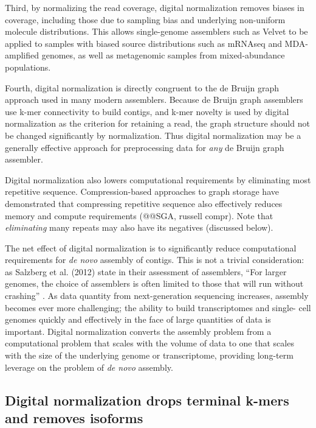 \documentclass[10pt]{article}
\begin{document}
Third, by normalizing the read coverage, digital normalization
removes biases in coverage, including those due to sampling bias and
underlying non-uniform molecule distributions.  This allows
single-genome assemblers such as Velvet to be applied to samples with
biased source distributions such as mRNAseq and MDA-amplified genomes,
as well as metagenomic samples from mixed-abundance populations.

Fourth, digital normalization is directly congruent to the de Bruijn
graph approach used in many modern assemblers.  Because de Bruijn
graph assemblers use k-mer connectivity to build contigs, and k-mer
novelty is used by digital normalization as the criterion for
retaining a read, the graph structure should not be changed
significantly by normalization.  Thus digital normalization may be a
generally effective approach for preprocessing data for {\em any} de
Bruijn graph assembler.

Digital normalization also lowers computational requirements by
eliminating most repetitive sequence.  Compression-based approaches to
graph storage have demonstrated that compressing repetitive sequence
also effectively reduces memory and compute requirements (@@SGA,
russell compr).  Note that {\em eliminating} many repeats may also
have its negatives (discussed below).


The net effect of digital normalization is to significantly reduce
computational requirements for {\em de novo} assembly of contigs.
This is not a trivial consideration: as Salzberg et al. (2012) state
in their assessment of assemblers, ``For larger genomes, the choice of
assemblers is often limited to those that will run without crashing''
\cite{pubmed22147368}.  As data quantity from next-generation
sequencing increases, assembly becomes ever more challenging; the
ability to build transcriptomes and single- cell genomes quickly and
effectively in the face of large quantities of data is important.
Digital normalization converts the assembly problem from a
computational problem that scales with the volume of data to one that
scales with the size of the underlying genome or transcriptome,
providing long-term leverage on the problem of {\em de novo} assembly.


\subsection*{Digital normalization drops terminal k-mers and removes isoforms}
\end{document}
